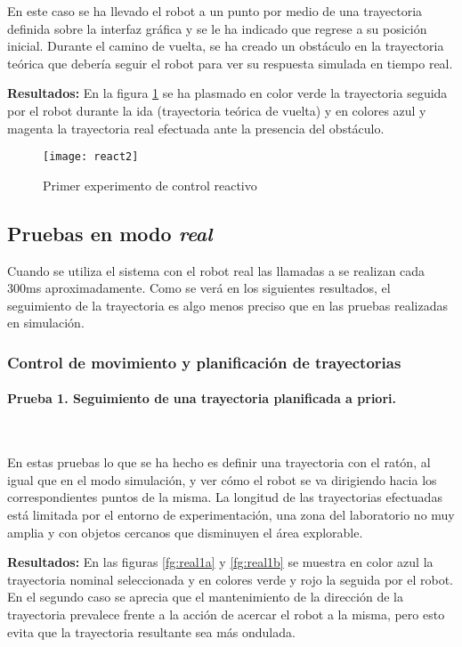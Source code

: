 \noindent
En este caso se ha llevado el robot a un punto por medio de una trayectoria definida sobre la interfaz gráfica y se le ha indicado que regrese a su posición inicial. Durante el camino de vuelta, se ha creado un obstáculo en la trayectoria teórica que debería seguir el robot para ver su respuesta simulada en tiempo real.

\textbf{Resultados:}
En la figura \ref{fg:react3} se ha plasmado en color verde la trayectoria seguida por el robot durante la ida (trayectoria teórica de vuelta) y en colores azul y magenta la trayectoria real efectuada ante la presencia del obstáculo.
\begin{figure}[h]
  \centering\texttt{[image: react2]}\\
  \caption{Primer experimento de control reactivo}\label{fg:react3}
\end{figure}

\clearpage

\subsection{Pruebas en modo \emph{real}}
Cuando se utiliza el sistema con el robot real las llamadas a  se realizan cada 300ms aproximadamente. Como se verá en los siguientes resultados, el seguimiento de la trayectoria es algo menos preciso que en las pruebas realizadas en simulación.

\subsubsection{Control de movimiento y planificación de trayectorias}

\paragraph{Prueba 1. Seguimiento de una trayectoria planificada a priori.}\ %

\noindent
En estas pruebas lo que se ha hecho es definir una trayectoria con el ratón, al igual que en el modo simulación, y ver cómo el robot se va dirigiendo hacia los correspondientes puntos de la misma. La longitud de las trayectorias efectuadas está limitada por el entorno de experimentación, una zona del laboratorio no muy amplia y con objetos cercanos que disminuyen el área explorable.

\textbf{Resultados:}
En las figuras \ref{fg:real1a} y \ref{fg:real1b} se muestra en color azul la trayectoria nominal seleccionada y en colores verde y rojo la seguida por el robot.
En el segundo caso se aprecia que el mantenimiento de la dirección de la trayectoria prevalece frente a la acción de acercar el robot a la misma, pero esto evita que la trayectoria resultante sea más ondulada.

